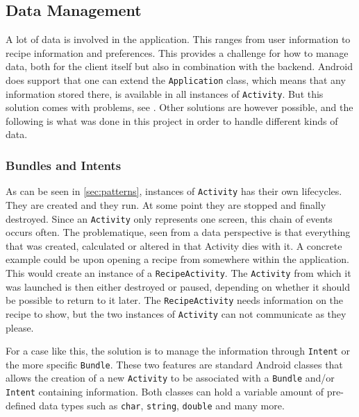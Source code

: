 \subsection{Data Management}
\label{subsec:datamanagement}

A lot of data is involved in the application. This ranges from user information to recipe information and preferences. This provides a challenge for how to manage data, both for the client itself but also in combination with the backend. Android does support that one can extend the \texttt{Application} class, which means that any information stored there, is available in all instances of \texttt{Activity}. But this solution comes with problems, see \citep{application_storage}. Other solutions are however possible, and the following is what was done in this project in order to handle different kinds of data.

\subsubsection{Bundles and Intents}
\label{subsubsec:bundles_and_intents}

As can be seen in \ref{sec:patterns}, instances of \texttt{Activity} has their own lifecycles. They are created and they run. At some point they are stopped and finally destroyed. Since an \texttt{Activity} only represents one screen, this chain of events occurs often. The problematique, seen from a data perspective is that everything that was created, calculated or altered in that Activity dies with it.
A concrete example could be upon opening a recipe from somewhere within the application. This would create an instance of a \texttt{RecipeActivity}. The \texttt{Activity} from which it was launched is then either destroyed or paused, depending on whether it should be possible to return to it later. The \texttt{RecipeActivity} needs information on the recipe to show, but the two instances of \texttt{Activity} can not communicate as they please.

For a case like this, the solution is to manage the information through \texttt{Intent} or the more specific \texttt{Bundle}. These two features are standard Android classes that allows the creation of a new \texttt{Activity} to be associated with a \texttt{Bundle} and/or \texttt{Intent} containing information\cite{intent}\cite{bundle}. Both classes can hold a variable amount of pre-defined data types such as \texttt{char}, \texttt{string}, \texttt{double} and many more.

